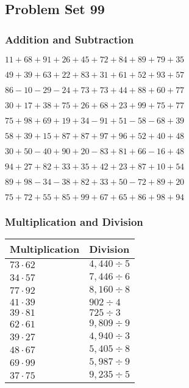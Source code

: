 \hypertarget{problem-set-99}{%
\subsection{Problem Set 99}\label{problem-set-99}}

\hypertarget{addition-and-subtraction}{%
\subsubsection{Addition and
Subtraction}\label{addition-and-subtraction}}

\(11+68+91+26+45+72+84+89+79+35\)

\(49+39+63+22+83+31+61+52+93+57\)

\(86-10-29-24+73+73+44+88+60+77\)

\(30+17+38+75+26+68+23+99+75+77\)

\(75+98+69+19+34-91+51-58-68+39\)

\(58+39+15+87+87+97+96+52+40+48\)

\(30+50-40+90+20-83+81+66-16+48\)

\(94+27+82+33+35+42+23+87+10+54\)

\(89+98-34-38+82+33+50-72+89+20\)

\(75+72+55+85+99+67+65+86+98+94\)

\hypertarget{multiplication-and-division}{%
\subsubsection{Multiplication and
Division}\label{multiplication-and-division}}

\begin{longtable}[]{@{}ll@{}}
\toprule
Multiplication & Division\tabularnewline
\midrule
\endhead
\(73\cdot62\) & \(4,440÷5\)\tabularnewline
\(34\cdot57\) & \(7,446÷6\)\tabularnewline
\(77\cdot92\) & \(8,160÷8\)\tabularnewline
\(41\cdot39\) & \(902÷4\)\tabularnewline
\(39\cdot81\) & \(725÷3\)\tabularnewline
\(62\cdot61\) & \(9,809÷9\)\tabularnewline
\(39\cdot27\) & \(4,940÷3\)\tabularnewline
\(48\cdot67\) & \(5,405÷8\)\tabularnewline
\(69\cdot99\) & \(5,987÷9\)\tabularnewline
\(37\cdot75\) & \(9,235÷5\)\tabularnewline
\bottomrule
\end{longtable}
